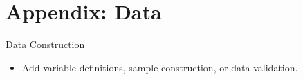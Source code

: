 \section{Appendix: Data}

\begin{frame}[label=appendix-data]{Data Construction}
  \begin{itemize}
    \item Add variable definitions, sample construction, or data validation.
  \end{itemize}
\end{frame}
